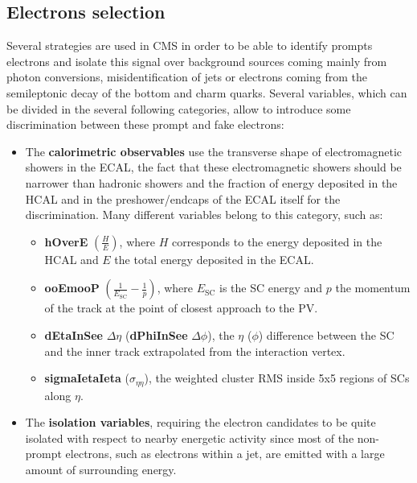 \documentclass[a4paper, 10pt, openright]{report}
\begin{document}
\subsection{Electrons selection} \label{section:EleSel}

Several strategies are used in \ac{CMS} in order to be able to identify prompts electrons and isolate this signal over background sources coming mainly from photon conversions, misidentification of jets or electrons coming from the semileptonic decay of the bottom and charm quarks. Several variables, which can be divided in the several following categories, allow to introduce some discrimination between these prompt and fake electrons:

\begin{itemize}
\item The \textbf{calorimetric observables} use the transverse shape of electromagnetic showers in the \ac{ECAL}, the fact that these electromagnetic showers should be narrower than hadronic showers and the fraction of energy deposited in the \ac{HCAL} and in the preshower/endcaps of the \ac{ECAL} itself for the discrimination. Many different variables belong to this category, such as:
\begin{itemize}
\item \textbf{hOverE} $\left ( \frac{H}{E} \right )$, where $H$ corresponds to the energy deposited in the \ac{HCAL} and $E$ the total energy deposited in the \ac{ECAL}.
\item \textbf{ooEmooP} $\left ( \frac{1}{E_{\text{SC}}} - \frac{1}{p} \right )$, where $E_{\text{SC}}$ is the \acf{SC} energy and $p$ the momentum of the track at the point of closest approach to the \ac{PV}.
\item \textbf{dEtaInSee} $\Delta \eta$ (\textbf{dPhiInSee} $\Delta \phi$), the $\eta$  ($\phi$) difference between the \ac{SC} and the inner track extrapolated from the interaction vertex.
\item \textbf{sigmaIetaIeta} ($\sigma_{\eta \eta}$), the weighted cluster \ac{RMS} inside 5x5 regions of \acp{SC} along $\eta$.
\end{itemize}
\item The \textbf{isolation variables}, requiring the electron candidates to be quite isolated with respect to nearby energetic activity since most of the non-prompt electrons, such as electrons within a jet, are emitted with a large amount of surrounding energy. 
\begin{itemize}

\end{itemize}
\end{itemize}
\end{document}
